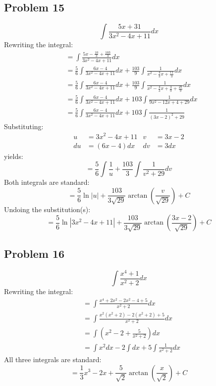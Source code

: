 \documentclass{article}
\begin{document}
\subsection*{Problem 15}
$$\int\frac{5x+31}{3x^2-4x+11}dx$$
Rewriting the integral:
\begin{align*}
&=\int\frac{5x-\frac{10}{3}+\frac{103}{3}}{3x^2-4x+11}dx \\
&=\frac{5}{6}\int\frac{6x-4}{3x^2-4x+11}dx+\frac{103}{9}\int\frac{1}{x^2-\frac{4}{3}x+\frac{11}{3}}dx \\
&=\frac{5}{6}\int\frac{6x-4}{3x^2-4x+11}dx+\frac{103}{9}\int\frac{1}{x^2-\frac{4}{3}x+\frac{4}{9}+\frac{29}{9}}dx \\
&=\frac{5}{6}\int\frac{6x-4}{3x^2-4x+11}dx+103\int\frac{1}{9x^2-12x+4+29}dx \\
&=\frac{5}{6}\int\frac{6x-4}{3x^2-4x+11}dx+103\int\frac{1}{(3x-2)^2+29}
\end{align*}
Substituting:
\begin{align*}
u&=3x^2-4x+11 &v&=3x-2 \\
du&=(6x-4)dx &dv&=3dx
\end{align*}
yields:
$$=\frac{5}{6}\int\frac{1}{u}+\frac{103}{3}\int\frac{1}{v^2+29}dv$$
Both integrals are standard:
$$=\frac{5}{6}\ln|u|+\frac{103}{3\sqrt{29}}\arctan\left(\frac{v}{\sqrt{29}}\right)+C$$
Undoing the substitution(s):
$$=\frac{5}{6}\ln\left|3x^2-4x+11\right|+\frac{103}{3\sqrt{29}}\arctan\left(\frac{3x-2}{\sqrt{29}}\right)+C$$
\subsection*{Problem 16}
$$\int\frac{x^4+1}{x^2+2}dx$$
Rewriting the integral:
\begin{align*}
&=\int\frac{x^4+2x^2-2x^2-4+5}{x^2+2}dx \\
&=\int\frac{x^2(x^2+2)-2(x^2+2)+5}{x^2+2}dx \\
&=\int\left(x^2-2+\frac{5}{x^2+2}\right)dx \\
&=\int x^2dx-2\int dx+5\int\frac{1}{x^2+2}dx
\end{align*}
All three integrals are standard:
$$=\frac{1}{3}x^3-2x+\frac{5}{\sqrt{2}}\arctan\left(\frac{x}{\sqrt{2}}\right)+C$$
\end{document}
